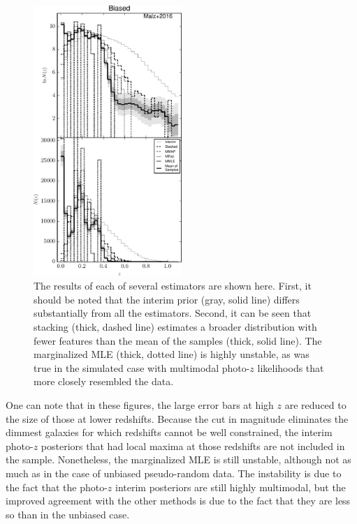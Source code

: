 \documentclass[preprint]{aastex}
\begin{document}
\begin{figure}
\includegraphics[width=0.5\textwidth]{figs/bias/comps.pdf}
\caption{The results of each of several estimators are shown here.  First, it 
should be noted that the interim prior (gray, solid line) differs substantially 
from all the estimators.  Second, it can be seen that stacking (thick, dashed 
line) estimates a broader distribution with fewer features than the mean of the 
samples (thick, solid line).  The marginalized MLE (thick, dotted line) is 
highly unstable, as was true in the simulated case with multimodal photo-$z$ 
likelihoods that more closely resembled the data.}
\label{fig:biascomp}
\end{figure}

One can note that in these figures, the large error bars at high $z$ are 
reduced to the size of those at lower redshifts.  Because the cut in magnitude 
eliminates the dimmest galaxies for which redshifts cannot be well constrained, 
the interim photo-$z$ posteriors that had local maxima at those redshifts are 
not included in the sample.  Nonetheless, the marginalized MLE is still 
unstable, although not as much as in the case of unbiased pseudo-random data.  
The instability is due to the fact that the photo-$z$ interim posteriors are 
still highly multimodal, but the improved agreement with the other methods is 
due to the fact that they are less so than in the unbiased case.
\end{document}
